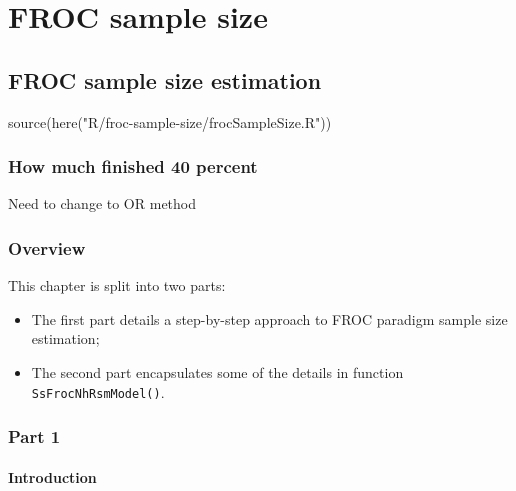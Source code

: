 \documentclass[
]{book}
\newenvironment{Shaded}{\begin{snugshade}}{\end{snugshade}}
\newcommand{\FunctionTok}[1]{\textcolor[rgb]{0.00,0.00,0.00}{#1}}
\newcommand{\NormalTok}[1]{#1}
\newcommand{\StringTok}[1]{\textcolor[rgb]{0.31,0.60,0.02}{#1}}
\begin{document}
\hypertarget{part-froc-sample-size}{%
\part*{FROC sample size}\label{part-froc-sample-size}}

\hypertarget{froc-sample-size}{%
\chapter{FROC sample size estimation}\label{froc-sample-size}}

\begin{Shaded}
\begin{Highlighting}[]
\FunctionTok{source}\NormalTok{(}\FunctionTok{here}\NormalTok{(}\StringTok{"R/froc{-}sample{-}size/frocSampleSize.R"}\NormalTok{))}
\end{Highlighting}
\end{Shaded}

\hypertarget{froc-sample-size-how-much-finished}{%
\section{How much finished 40 percent}\label{froc-sample-size-how-much-finished}}

Need to change to OR method

\hypertarget{overview}{%
\section{Overview}\label{overview}}

This chapter is split into two parts:

\begin{itemize}
\item
  The first part details a step-by-step approach to FROC paradigm sample size estimation;
\item
  The second part encapsulates some of the details in function \texttt{SsFrocNhRsmModel()}.
\end{itemize}

\hypertarget{part-1}{%
\section{Part 1}\label{part-1}}

\hypertarget{froc-sample-size-intro}{%
\subsection{Introduction}\label{froc-sample-size-intro}}
\end{document}
